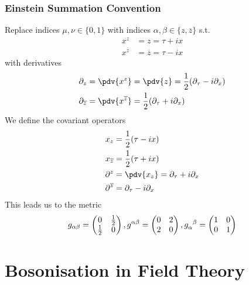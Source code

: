 \documentclass[twoside,symmetric, openany, 12pt]{./tuftebook}
\theoremstyle{definition}
\theoremstyle{definition}
\theoremstyle{definition}
\begin{document}
\subsection{Einstein Summation Convention}
Replace indices $\mu,\nu\in \{0,1\} $ with indices $\alpha, \beta \in \{z, \overline{z}\} $ s.t.
\begin{align*}
	x^z &=  z = \tau + ix \\
	x^{\overline{z}} &= \overline{z} = \tau - ix
\end{align*}
with derivatives
\begin{align*}
	\partial_z &= \pdv{x^z} = \pdv{z} = \frac{1}{2}(\partial_\tau - i\partial_x)\\
	\partial_{\overline{z}} &= \pdv{x^{\overline{z}}} = \frac{1}{2}(\partial_\tau + i\partial_x)
\end{align*}
We define the covariant operators
\begin{align*}
	x_z &= \frac{1}{2}(\tau - ix)\\
	x_{\overline{z}} &= \frac{1}{2}(\tau + ix)\\
	\partial^z &= \pdv{x_z} = \partial_\tau + i\partial_x\\
	\partial^{\overline{z}} &= \partial_\tau - i\partial_x
\end{align*}
This leads us to the metric
\begin{align*}
	g_{\alpha\beta} = \begin{pmatrix} 0 & \frac{1}{2} \\ \frac{1}{2} & 0 \end{pmatrix} , g^{\alpha\beta} = \begin{pmatrix}  0 & 2 \\ 2 & 0 \end{pmatrix} , \tensor{g}{_\alpha^\beta} = \begin{pmatrix} 1 & 0 \\ 0  & 1 \end{pmatrix} 
\end{align*}
\chapter{Bosonisation in Field Theory}
\end{document}
